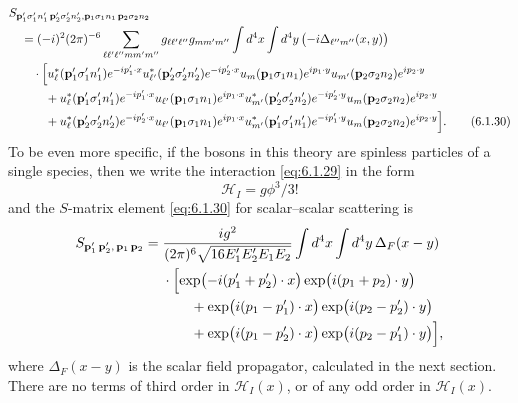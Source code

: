 \begin{align}
&S_{\mathbf p'_1\sigma'_1n'_1\,\mathbf p'_2\sigma'_2n'_2,
       \mathbf p_1\sigma_1n_1\,\mathbf p_2\sigma_2n_2}
\notag\\
&\quad=(-i)^2(2\pi)^{-6}
 \sum_{\ell\ell'\ell''mm'm''}
 g_{\ell\ell'\ell''}g_{mm'm''}
 \int d^4x\int d^4y\,
 \bigl(-i\Delta_{\ell''m''}(x,y)\bigr)
\notag\\
&\qquad\cdot\Bigl[
 u_\ell^*(\mathbf p'_1\sigma'_1n'_1)e^{-ip'_1\cdot x}
 u_{\ell'}^*(\mathbf p'_2\sigma'_2n'_2)e^{-ip'_2\cdot x}
 u_m(\mathbf p_1\sigma_1n_1)e^{ip_1\cdot y}
 u_{m'}(\mathbf p_2\sigma_2n_2)e^{ip_2\cdot y}
\notag\\
&\qquad\quad+
 u_\ell^*(\mathbf p'_1\sigma'_1n'_1)e^{-ip'_1\cdot x}
 u_{\ell'}(\mathbf p_1\sigma_1n_1)e^{ip_1\cdot x}
 u_{m'}^*(\mathbf p'_2\sigma'_2n'_2)e^{-ip'_2\cdot y}
 u_m(\mathbf p_2\sigma_2n_2)e^{ip_2\cdot y}
\notag\\
&\qquad\quad+
 u_\ell^*(\mathbf p'_2\sigma'_2n'_2)e^{-ip'_2\cdot x}
 u_{\ell'}(\mathbf p_1\sigma_1n_1)e^{ip_1\cdot x}
 u_{m'}^*(\mathbf p'_1\sigma'_1n'_1)e^{-ip'_1\cdot y}
 u_m(\mathbf p_2\sigma_2n_2)e^{ip_2\cdot y}
 \Bigr].
\tag{6.1.30}
\label{eq:6.1.30}
\end{align}
To be even more specific, if the bosons in this theory are spinless particles
of a single species, then we write the interaction \eqref{eq:6.1.29} in the form
\begin{equation}
\mathcal H_I=g\phi^3/3!
\tag{6.1.31}
\label{eq:6.1.31}
\end{equation}
and the $S$-matrix element \eqref{eq:6.1.30} for scalar--scalar scattering is
\begin{align*}
S_{\mathbf p'_1\,\mathbf p'_2,\,\mathbf p_1\,\mathbf p_2}
={}&\frac{ig^2}{(2\pi)^6\sqrt{16E'_1E'_2E_1E_2}}
 \int d^4x\int d^4y\,\Delta_F(x-y)
\notag\\
&\cdot\Bigl[
 \exp\bigl(-i(p'_1+p'_2)\cdot x\bigr)
 \exp\bigl(i(p_1+p_2)\cdot y\bigr)
\notag\\
&\qquad+
 \exp\bigl(i(p_1-p'_1)\cdot x\bigr)
 \exp\bigl(i(p_2-p'_2)\cdot y\bigr)
\notag\\
&\qquad+
 \exp\bigl(i(p_1-p'_2)\cdot x\bigr)
 \exp\bigl(i(p_2-p'_1)\cdot y\bigr)
 \Bigr],
\end{align*}
where $\Delta_F(x-y)$ is the scalar field propagator, calculated in the next
section. There are no terms of third order in $\mathcal H_I(x)$, or of any odd
order in $\mathcal H_I(x)$.
